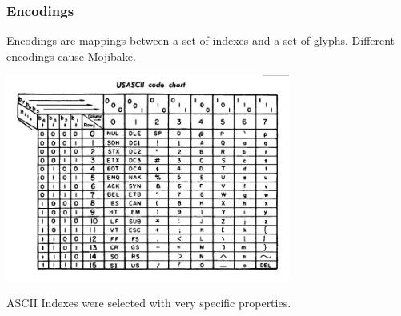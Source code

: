 \documentclass{beamer}
\begin{document}
\begin{frame}
  \frametitle{Encodings}
  \begin{block}{}
    Encodings are mappings between a set of indexes and a set of
    glyphs. Different encodings cause Mojibake.
  \end{block}

  \medskip

  \includegraphics[width=0.7\textwidth]{img/ASCIItableOld}

  \medskip

  ASCII Indexes were selected with very specific properties.
  
\end{frame}

\end{document}
